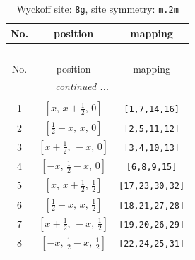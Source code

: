 \documentclass[fleqn,8pt]{jsarticle}
\begin{document}
\begin{longtable}{ccc}
\caption{Wyckoff site: {\tt 8g}, site symmetry: {\tt m.2m}}
 \\
 \hline \hline
No. & position & mapping \\ \hline \endfirsthead

\multicolumn{2}{l}{\tablename\ \thetable{}} \\
 \hline \hline
No. & position & mapping \\ \hline \endhead

 \hline \hline
\multicolumn{2}{r}{\footnotesize\it continued ...} \\ \endfoot

 \hline \hline
\multicolumn{2}{r}{} \\ \endlastfoot

1 & $\left[ x,\, x + \frac{1}{2},\, 0 \right]$ & {\tt [1,7,14,16]} \\ \hline
2 & $\left[ \frac{1}{2} - x,\, x,\, 0 \right]$ & {\tt [2,5,11,12]} \\ \hline
3 & $\left[ x + \frac{1}{2},\, - x,\, 0 \right]$ & {\tt [3,4,10,13]} \\ \hline
4 & $\left[ - x,\, \frac{1}{2} - x,\, 0 \right]$ & {\tt [6,8,9,15]} \\ \hline
5 & $\left[ x,\, x + \frac{1}{2},\, \frac{1}{2} \right]$ & {\tt [17,23,30,32]} \\ \hline
6 & $\left[ \frac{1}{2} - x,\, x,\, \frac{1}{2} \right]$ & {\tt [18,21,27,28]} \\ \hline
7 & $\left[ x + \frac{1}{2},\, - x,\, \frac{1}{2} \right]$ & {\tt [19,20,26,29]} \\ \hline
8 & $\left[ - x,\, \frac{1}{2} - x,\, \frac{1}{2} \right]$ & {\tt [22,24,25,31]} \\
\end{longtable}
\renewcommand{\arraystretch}{1.2}
\end{document}
